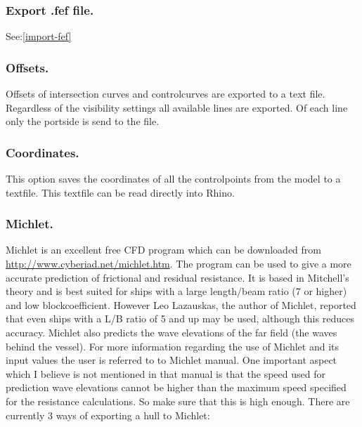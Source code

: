 \documentclass[12pt]{article}
\begin{document}
\subsubsection{Export .fef file.}
See:\ref{import-fef}

\subsubsection{Offsets.}
Offsets of intersection curves and controlcurves are exported to a
text file. Regardless of the visibility settings all available lines
are exported. Of each line only the portside is send to the file.

\subsubsection{Coordinates.}
This option saves the coordinates of all the controlpoints from the
model to a textfile. This textfile can be read directly into Rhino.

\subsubsection{Michlet.} \label{michlet}
Michlet is an excellent free CFD program which can be downloaded from
\url{http://www.cyberiad.net/michlet.htm}. The program can be used to give a more accurate prediction
of frictional and residual resistance. It is based in Mitchell's
theory and is best suited for ships with a large length/beam ratio (7
or higher) and low blockcoefficient. However Leo Lazauskas, the author
of Michlet, reported that even ships with a L/B ratio of 5 and up may
be used, although this reduces accuracy. Michlet also predicts the
wave elevations of the far field (the waves behind the vessel). For
more information regarding the use of Michlet and its input values the
user is referred to to Michlet manual.  One important aspect which I
believe is not mentioned in that manual is that the speed used for
prediction wave elevations cannot be higher than the maximum speed
specified for the resistance calculations. So make sure that this is
high enough.  There are currently 3 ways of exporting a hull to
Michlet:
\end{document}
